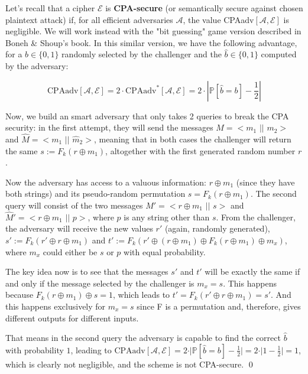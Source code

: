 Let's recall that a cipher $\mathcal{E}$ is \textbf{CPA-secure} (or semantically secure against chosen plaintext attack) if, for all efficient adversaries $\mathcal{A}$, the value CPAadv$[\mathcal{A}, \mathcal{E}]$ is negligible. We will work instead with the "bit guessing" game version described in Boneh \& Shoup's book. In this similar version, we have the following advantage, for a $b \in \{0, 1\}$ randomly selected by the challenger and the $\hat b \in \{0, 1\}$ computed by the adversary:

\begin{equation*}
    \text{CPAadv}[\mathcal{A}, \mathcal{E}] = 2 \cdot \text{CPAadv}^{*}[\mathcal{A}, \mathcal{E}] = 2 \cdot \left| \mathbb{P}[\hat{b} = b] - \frac{1}{2} \right|
\end{equation*}

Now, we build an smart adversary that only takes 2 queries to break the CPA security: in the first attempt, they will send the messages $M = <m_1$ $\vert \vert$ $m_2>$ and $\hat M = <m_1$ $\vert \vert$ $\hat m_2>$, meaning that in both cases the challenger will return the same $s := F_k (r \oplus m_1)$, altogether with the first generated random number $r$.

Now the adversary has access to a valuous information: $r \oplus m_1$ (since they have both strings) and its pseudo-random permutation $s = F_k (r \oplus m_1)$.
The second query will consist of the two messages $M' = <r \oplus m_1$ $\vert \vert$ $s>$ and $\hat M' = <r \oplus m_1$ $\vert \vert$ $p>$, where $p$ is any string other than $s$.
From the challenger, the adversary will receive the new values $r'$ (again, randomly generated), $s' := F_k(r' \oplus r \oplus m_1)$ and $t' := F_k(r' \oplus (r \oplus m_1) \oplus F_k (r \oplus m_1) \oplus m_x)$, where $m_x$ could either be $s$ or $p$ with equal probability.

The key idea now is to see that the messages $s'$ and $t'$ will be exactly the same if and only if the message selected by the challenger is $m_x = s$.
This happens because $F_k(r \oplus m_1) \oplus s = 1$, which leads to $t' = F_k(r' \oplus r \oplus m_1) = s'$.
And this happens exclusively for $m_x = s$ since F is a permutation and, therefore, gives different outputs for different inputs.

That means in the second query the adversary is capable to find the correct $\hat b$ with probability $1$, leading to $\text{CPAadv}[\mathcal{A}, \mathcal{E}] = 2 \cdot \vert \mathbb{P}[\hat{b} = b] - \frac{1}{2} \vert = 2 \cdot \vert 1 - \frac{1}{2} \vert = 1$, which is clearly not negligible, and the scheme is not CPA-secure. \hfill \qed

